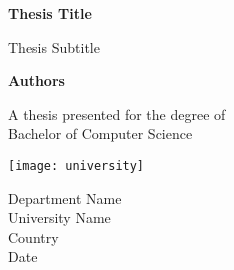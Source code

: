 \begin{titlepage}
   \begin{center}
       \vspace*{1cm}

       \textbf{Thesis Title}

       \vspace{0.5cm}
        Thesis Subtitle
            
       \vspace{1.5cm}

       \textbf{Authors}

      \vfill
            
      A thesis presented for the degree of\\
      Bachelor of Computer Science
            
       \vspace{0.8cm}
     
       \texttt{[image: university]}
            
       Department Name\\
       University Name\\
       Country\\
       Date
            
   \end{center}
\end{titlepage}